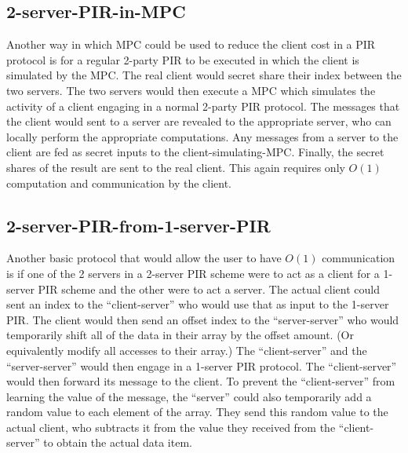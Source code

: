 \subsection{2-server-PIR-in-MPC}

Another way in which MPC could be used to reduce the client cost in
a PIR protocol is for a regular 2-party PIR to be executed
in which the client is simulated by the MPC. 
The real client would secret share their index between the two
servers. The two servers would then execute a MPC which
simulates the activity of a client engaging in a normal 2-party
PIR protocol. The messages that the client would sent to a server
are revealed to the appropriate server, who can locally perform
the appropriate computations. Any messages from a server to 
the client are fed as secret inputs to the client-simulating-MPC.
Finally, the secret shares of the result are sent to the real 
client. This again requires only $O(1)$ computation and communication
by the client.


\subsection{2-server-PIR-from-1-server-PIR}

Another basic protocol that would allow the user to have
$O(1)$ communication is if one of the 2 servers in a 2-server
PIR scheme were to act as a client for a 1-server PIR scheme
and the other were to act a server. 
The actual client could sent an index to the ``client-server''
who would use that as input to the 1-server PIR.
The client would then send an offset index to the ``server-server''
who would temporarily shift all of the data in their array
by the offset amount. (Or equivalently modify all accesses to their array.)
The ``client-server'' and the ``server-server'' would then
engage in a 1-server PIR protocol.
The ``client-server'' would then forward its message to the client.
To prevent the ``client-server'' from learning the value of the message,
the ``server'' could also temporarily add a random value to each element
of the array. They send this random value to the actual client, who
subtracts it from the value they received from the ``client-server'' 
to obtain the actual data item.

